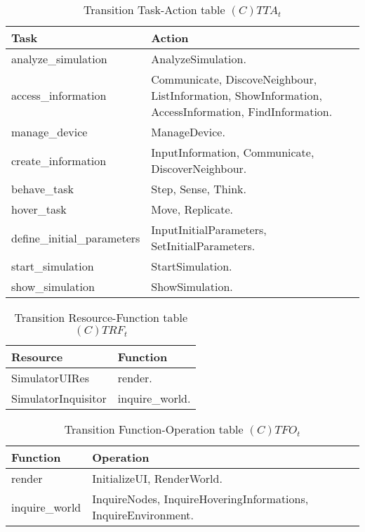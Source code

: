 \begin{table}[H]
	\centering
	\begin{tabular}{|p{4cm}|p{8cm}|}
			\hline
			\textbf{Task} & \textbf{Action} \\
			\hline
			analyze\_simulation & AnalyzeSimulation. \\
			\hline
			access\_information & Communicate, DiscoveNeighbour, ListInformation,
			ShowInformation, AccessInformation, FindInformation.\\
			\hline
			manage\_device & ManageDevice. \\
			\hline
			create\_information & InputInformation, Communicate, DiscoverNeighbour. \\
			\hline
			behave\_task & Step, Sense, Think. \\
			\hline
			hover\_task & Move, Replicate. \\
			\hline
			define\_initial\_parameters & InputInitialParameters, SetInitialParameters. \\
			\hline
			start\_simulation & StartSimulation. \\
			\hline
			show\_simulation & ShowSimulation. \\
			\hline
		\end{tabular}
	\caption{Transition Task-Action table $(C)TTA_t$}
	\label{tab:cttat}
\end{table}

\begin{table}[H]
	\centering
	\begin{tabular}{|p{4cm}|p{8cm}|}
			\hline
			\textbf{Resource} & \textbf{Function} \\
			\hline
			SimulatorUIRes & render. \\
			\hline
			SimulatorInquisitor & inquire\_world. \\
			\hline
		\end{tabular}
	\caption{Transition Resource-Function table $(C)TRF_t$}
	\label{tab:ctrft}
\end{table}

\begin{table}[H]
	\centering
	\begin{tabular}{|p{4cm}|p{8cm}|}
			\hline
			\textbf{Function} & \textbf{Operation} \\
			\hline
			render & InitializeUI, RenderWorld. \\
			\hline
			inquire\_world & InquireNodes, InquireHoveringInformations, InquireEnvironment. \\
			\hline
		\end{tabular}
	\caption{Transition Function-Operation table $(C)TFO_t$}
	\label{tab:ctfot}
\end{table}


